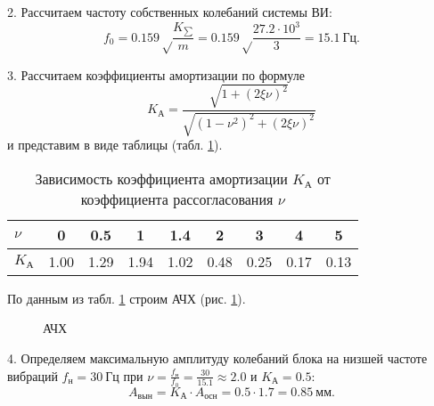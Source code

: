 2. Рассчитаем частоту собственных колебаний системы ВИ:
\[
    f_0 = 0.159 \sqrt \frac{K_{\sum}}{m}
        = 0.159 \sqrt \frac{27.2 \cdot 10^3}{3}
        = 15.1~Гц.
\]

3. Рассчитаем коэффициенты амортизации по формуле
\[
    K_{А} = \frac{\sqrt{1 + (2 \xi \nu)^2}}{\sqrt{(1 - \nu^2)^2 + (2 \xi \nu)^2}}
\]
и представим в виде таблицы (табл. \ref{tab:amortisation_coeffs}).

\begin{table}[!h]
    \centering
    \caption{Зависимость коэффициента амортизации $K_{А}$ от коэффициента рассогласования $\nu$}
    \label{tab:amortisation_coeffs}
    \begin{tabular}{|l|c|c|c|c|c|c|c|c|}
        \hline
        $\nu$  & 0    & 0.5  & 1    & 1.4  & 2    & 3    & 4    & 5    \\ \hline
        $K_{А}$  & 1.00 & 1.29 & 1.94 & 1.02 & 0.48 & 0.25 & 0.17 & 0.13 \\ \hline
    \end{tabular}
\end{table}

По данным из табл. \ref{tab:amortisation_coeffs} строим АЧХ (рис. \ref{fig:frequency-response}).

\begin{figure}[!h]
    \centering
    \caption{АЧХ}
    \label{fig:frequency-response}
\end{figure}

4. Определяем максимальную амплитуду колебаний блока на низшей частоте вибраций $f_{н} = 30~Гц$ при $\nu = \frac{f_{н}}{f_0} = \frac{30}{15.1} \approx 2.0$ и $K_{А} = 0.5$:
\[
    A_{вын} = K_{А} \cdot A_{осн}
    = 0.5 \cdot 1.7
    = 0.85~мм.
\]

